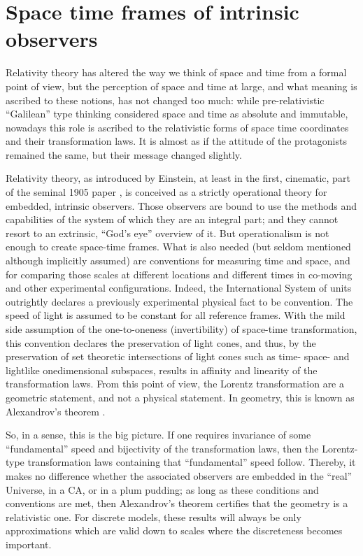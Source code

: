 \documentclass[pre,preprint,showpacs,showkeys,amsfonts]{revtex4}
\begin{document}
\section{Space time frames of intrinsic observers}

Relativity theory has altered the way we think of space
and time  from a formal point of view,  but
the perception of space and time at large,
and what meaning is ascribed to these notions,
has not changed too much:
while pre-relativistic ``Galilean'' type thinking considered
space and time as absolute and immutable, nowadays this role
is ascribed to the relativistic forms of space time coordinates
and their transformation laws.
It is almost as if the attitude of the protagonists remained the same, but their
message changed slightly.

Relativity theory, as introduced by Einstein,
at least in the first, cinematic, part of the seminal 1905 paper \cite{ein-05},
is conceived as a strictly operational theory for embedded, intrinsic
observers. Those observers are bound to use the methods and capabilities of the
system of which they are an integral part;
and they cannot resort to an extrinsic, ``God's eye'' overview of it.
But operationalism is not enough to create space-time frames.
What is also needed (but seldom mentioned although implicitly assumed)
are conventions for measuring time and space,
and for comparing those scales at different locations and different times
in co-moving and other experimental configurations.
Indeed, the International System of units
outrightly declares a previously experimental physical fact
to be convention.
The speed of light is assumed to be constant for all reference frames.
With the mild side assumption of the one-to-oneness (invertibility) of
space-time transformation,
this convention declares the preservation of light cones,
and thus, by the preservation of set theoretic intersections of light cones
such as time- space- and lightlike onedimensional subspaces,
results in affinity and linearity of the transformation laws.
From this point of view, the Lorentz transformation
are a geometric statement, and not a physical statement.
In geometry, this is known as Alexandrov's theorem
\cite{alex1,alex2,alex3,alex-col,borchers-heger,benz,lester}.

So, in a sense, this is  the big picture.
If one requires invariance of some ``fundamental'' speed and bijectivity of the
transformation laws, then the Lorentz-type transformation laws
containing that ``fundamental'' speed
follow.
Thereby, it makes no difference whether the associated observers are embedded in
the ``real'' Universe, in a CA, or in a plum pudding; as long as
these conditions and conventions are met, then
Alexandrov's theorem certifies that the geometry is a relativistic one.
For discrete models, these results will always be only approximations
which are valid down to scales where the discreteness becomes important.
\end{document}
